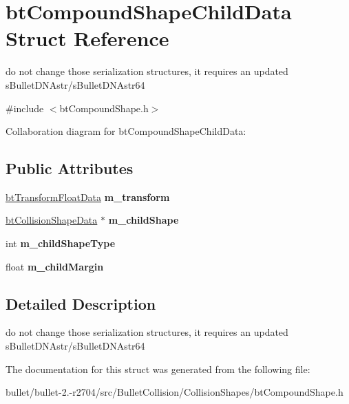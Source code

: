 \hypertarget{structbt_compound_shape_child_data}{\section{bt\+Compound\+Shape\+Child\+Data Struct Reference}
\label{structbt_compound_shape_child_data}
}


do not change those serialization structures, it requires an updated s\+Bullet\+D\+N\+Astr/s\+Bullet\+D\+N\+Astr64  




{\ttfamily \#include $<$bt\+Compound\+Shape.\+h$>$}



Collaboration diagram for bt\+Compound\+Shape\+Child\+Data\+:
\subsection*{Public Attributes}
\begin{DoxyCompactItemize}
\item 
\hypertarget{structbt_compound_shape_child_data_aa4e204a234cb5fcc33904433d0f87d06}{\hyperlink{structbt_transform_float_data}{bt\+Transform\+Float\+Data} {\bfseries m\+\_\+transform}}\label{structbt_compound_shape_child_data_aa4e204a234cb5fcc33904433d0f87d06}

\item 
\hypertarget{structbt_compound_shape_child_data_ac9fa752831417cb97a78c727b7b047ea}{\hyperlink{structbt_collision_shape_data}{bt\+Collision\+Shape\+Data} $\ast$ {\bfseries m\+\_\+child\+Shape}}\label{structbt_compound_shape_child_data_ac9fa752831417cb97a78c727b7b047ea}

\item 
\hypertarget{structbt_compound_shape_child_data_a870f5c357ff4c5e0da76d56755890af1}{int {\bfseries m\+\_\+child\+Shape\+Type}}\label{structbt_compound_shape_child_data_a870f5c357ff4c5e0da76d56755890af1}

\item 
\hypertarget{structbt_compound_shape_child_data_a504e17125ac8eb1bca4d2168832eb463}{float {\bfseries m\+\_\+child\+Margin}}\label{structbt_compound_shape_child_data_a504e17125ac8eb1bca4d2168832eb463}

\end{DoxyCompactItemize}


\subsection{Detailed Description}
do not change those serialization structures, it requires an updated s\+Bullet\+D\+N\+Astr/s\+Bullet\+D\+N\+Astr64 

The documentation for this struct was generated from the following file\+:\begin{DoxyCompactItemize}
\item 
bullet/bullet-\/2.-\/r2704/src/\+Bullet\+Collision/\+Collision\+Shapes/bt\+Compound\+Shape.\+h\end{DoxyCompactItemize}

